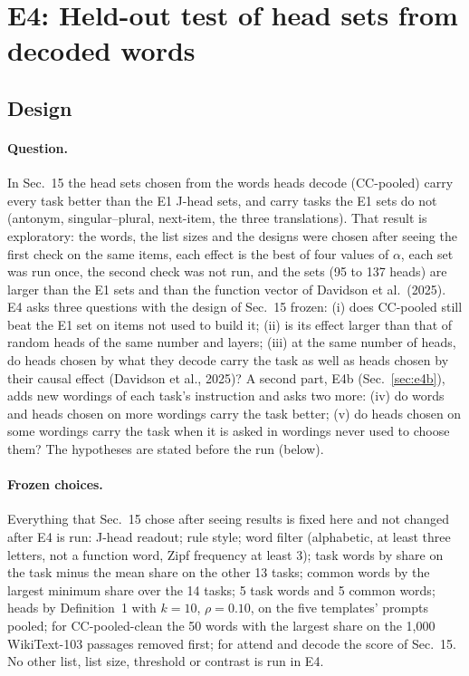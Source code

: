 
\section{E4: Held-out test of head sets from decoded words}
\label{sec:e4}

\subsection{Design}

\paragraph{Question.} In Sec.~15 the head sets chosen from the words heads decode
(CC-pooled) carry every task better than the E1 J-head sets, and carry tasks the E1 sets do
not (antonym, singular--plural, next-item, the three translations). That result is exploratory:
the words, the list sizes and the designs were chosen after seeing the first check on the same
items, each effect is the best of four values of $\alpha$, each set was run once, the second check
was not run, and the sets (95 to 137 heads) are larger than the E1 sets and than the function
vector of Davidson et al.\ (2025). E4 asks three questions with the design of Sec.~15 frozen:
(i) does CC-pooled still beat the E1 set on items not used to build it; (ii) is its effect larger
than that of random heads of the same number and layers; (iii) at the same number of heads, do
heads chosen by what they decode carry the task as well as heads chosen by their causal effect
(Davidson et al., 2025)? A second part, E4b (Sec.~\ref{sec:e4b}), adds new wordings of
each task's instruction and asks two more: (iv) do words and heads chosen on more wordings
carry the task better; (v) do heads chosen on some wordings carry the task when it is asked in
wordings never used to choose them? The hypotheses are stated before the run (below).

\paragraph{Frozen choices.} Everything that Sec.~15 chose after seeing results is fixed here
and not changed after E4 is run: J-head readout; rule style; word filter (alphabetic, at least
three letters, not a function word, Zipf frequency at least 3); task words by share on the task
minus the mean share on the other 13 tasks; common words by the largest minimum share over
the 14 tasks; 5 task words and 5 common words; heads by Definition~1 with $k = 10$,
$\rho = 0.10$, on the five templates' prompts pooled; for CC-pooled-clean the 50 words with the
largest share on the 1{,}000 WikiText-103 passages removed first; for attend and decode the
score of Sec.~15. No other list, list size, threshold or contrast is run in E4.

